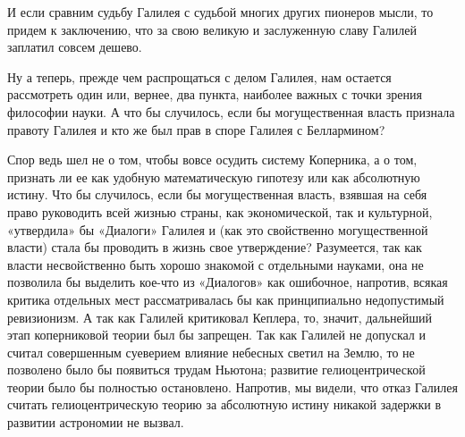 И если сравним судьбу Галилея  с судьбой многих других пионеров мысли,
то  придем к  заключению,  что  за свою  великую  и заслуженную  славу
Галилей заплатил совсем дешево.

Ну а  теперь, прежде  чем распрощаться с  делом Галилея,  нам остается
рассмотреть  один или,  вернее, два  пункта, наиболее  важных с  точки
зрения философии  науки. А  что бы  случилось, если  бы могущественная
власть признала  правоту Галилея и кто  же был прав в  споре Галилея с
Беллармином?

Спор  ведь шел  не о  том, чтобы  вовсе осудить  систему Коперника,  а
о  том,  признать  ли  ее  как  удобную  математическую  гипотезу  или
как  абсолютную  истину.  Что  бы случилось,  если  бы  могущественная
власть,  взявшая на  себя  право руководить  всей  жизнью страны,  как
экономической, так  и культурной,  «утвердила» бы «Диалоги»  Галилея и
(как это свойственно могущественной власти) стала бы проводить в жизнь
свое утверждение? Разумеется, так как власти несвойственно быть хорошо
знакомой с отдельными науками, она не позволила бы выделить кое-что из
«Диалогов»  как ошибочное,  напротив,  всякая  критика отдельных  мест
рассматривалась  бы  как  принципиально  недопустимый  ревизионизм.  А
так  как  Галилей  критиковал  Кеплера, то,  значит,  дальнейший  этап
коперниковой теории  был бы  запрещен. Так как  Галилей не  допускал и
считал совершенным суеверием  влияние небесных светил на  Землю, то не
позволено было бы появиться трудам Ньютона; развитие гелиоцентрической
теории было бы  полностью остановлено. Напротив, мы  видели, что отказ
Галилея считать гелиоцентрическую теорию  за абсолютную истину никакой
задержки в развитии астрономии не вызвал.

